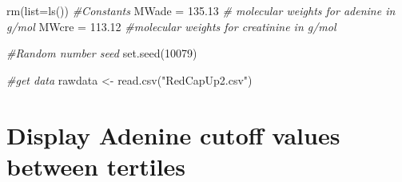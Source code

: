 \documentclass[
]{article}
\newenvironment{Shaded}{\begin{snugshade}}{\end{snugshade}}
\newcommand{\AttributeTok}[1]{\textcolor[rgb]{0.77,0.63,0.00}{#1}}
\newcommand{\CommentTok}[1]{\textcolor[rgb]{0.56,0.35,0.01}{\textit{#1}}}
\newcommand{\ConstantTok}[1]{\textcolor[rgb]{0.00,0.00,0.00}{#1}}
\newcommand{\DecValTok}[1]{\textcolor[rgb]{0.00,0.00,0.81}{#1}}
\newcommand{\FloatTok}[1]{\textcolor[rgb]{0.00,0.00,0.81}{#1}}
\newcommand{\FunctionTok}[1]{\textcolor[rgb]{0.00,0.00,0.00}{#1}}
\newcommand{\NormalTok}[1]{#1}
\newcommand{\OtherTok}[1]{\textcolor[rgb]{0.56,0.35,0.01}{#1}}
\newcommand{\SpecialCharTok}[1]{\textcolor[rgb]{0.00,0.00,0.00}{#1}}
\newcommand{\StringTok}[1]{\textcolor[rgb]{0.31,0.60,0.02}{#1}}
\begin{document}
\begin{Shaded}
\begin{Highlighting}[]
\FunctionTok{rm}\NormalTok{(}\AttributeTok{list=}\FunctionTok{ls}\NormalTok{())}
\CommentTok{\#Constants}
\NormalTok{MWade }\OtherTok{=} \FloatTok{135.13} \CommentTok{\# molecular weights for adenine in g/mol}
\NormalTok{MWcre }\OtherTok{=} \FloatTok{113.12} \CommentTok{\#molecular weights for creatinine in g/mol}

\CommentTok{\#Random number seed}
\FunctionTok{set.seed}\NormalTok{(}\DecValTok{10079}\NormalTok{)}
\end{Highlighting}
\end{Shaded}

\begin{Shaded}
\begin{Highlighting}[]
\CommentTok{\#get data}
\NormalTok{rawdata }\OtherTok{\textless{}{-}} \FunctionTok{read.csv}\NormalTok{(}\StringTok{"RedCapUp2.csv"}\NormalTok{)}
\end{Highlighting}
\end{Shaded}

\begin{Shaded}
\end{Shaded}

\hypertarget{display-adenine-cutoff-values-between-tertiles}{%
\section{Display Adenine cutoff values between
tertiles}\label{display-adenine-cutoff-values-between-tertiles}}

\begin{Shaded}
\end{Shaded}
\end{document}
